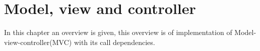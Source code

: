 \chapter{Model, view and controller}
In this chapter an overview is given, this overview is of implementation of Model-view-controller(MVC) with its call dependencies.

